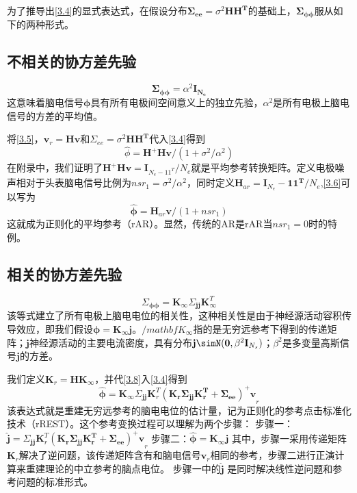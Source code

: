 为了推导出\eqref{3.4}的显式表达式，在假设分布$\mathbf{\Sigma_{ee}}=\sigma^{2}\mathbf{HH^T}$的基础上，$\mathbf{\Sigma_{\phi\phi}}$服从如下的两种形式。
\subsection{不相关的协方差先验}
\begin{equation}\label{3.5}
\mathbf{\Sigma_{\phi\phi}}=\alpha^{2}\mathbf{I_{N_{e}}}
\end{equation}
这意味着脑电信号$\mathbf{\phi}$具有所有电极间空间意义上的独立先验，$\alpha^{2}$是所有电极上脑电信号的方差的平均值。

将\eqref{3.5}，$\mathbf{v}_{r}=\mathbf{Hv}$和$\Sigma_{ee}=\sigma^{2}\mathbf{HH^{T}}$代入\eqref{3.4}得到
\begin{equation}\label{3.6}
\hat{\phi}=\mathbf{H^{+}Hv}/(1+\sigma^{2}/{\alpha^{2}})
\end{equation}
在附录中，我们证明了$\mathbf{H^{+}Hv}=\mathbf{I}_{N_{e}-11^{T}}/{N_{e}}$就是平均参考转换矩阵。定义电极噪声相对于头表脑电信号比例为$nsr_{1}=\sigma^{2}/\alpha^{2}$，同时定义$\mathbf{H}_{ar}=\mathbf{I}_{N_{e}}-\mathbf{11^T}/{N_{e}}$,\eqref{3.6}可以写为
\begin{equation}
\hat{\mathbf{\phi}}=\mathbf{H}_{ar}\mathbf{v}/(1+nsr_{1})
\end{equation}
这就成为正则化的平均参考（rAR）。显然，传统的AR是rAR当$nsr_{1}=0$时的特例。
\subsection{相关的协方差先验}
\begin{equation}\label{3.8}
\Sigma_{\mathbf{\phi\phi}}=\mathbf{K}_{\infty}\Sigma_{\mathbf{jj}}\mathbf{K}_{\infty}^T
\end{equation}
该等式建立了所有电极上脑电电位的相关性，这种相关性是由于神经源活动容积传导效应，即我们假设$\mathbf{\phi}=\mathbf{K}_{\infty}\mathbf{j}$。$/mathbf{K}_{\infty}$指的是无穷远参考下得到的传递矩阵；$\mathbf{j}$神经源活动的主要电流密度，具有分布$\mathbf{j}\simN(\mathbf{0},\beta^{2}\mathbf{I}_{N_{s}})$；$\beta^{2}$是多变量高斯信号$\mathbf{j}$的方差。

我们定义$\mathbf{K}_{r}=\mathbf{HK}_{\infty}$，并代\eqref{3.8}入\eqref{3.4}得到
\begin{equation}\label{3.9}
\hat{\mathbf{\phi}}=\mathbf{K}_{\infty}\Sigma_{\mathbf{jj}}\mathbf{K}_{r}^{T}\mathbf{(\mathbf{K}_{r}\Sigma_{\mathbf{jj}}\mathbf{K}_{r}^{T}+\Sigma_{ee})^{+}v}_{r}
\end{equation}
该表达式就是重建无穷远参考的脑电电位的估计量，记为正则化的参考点击标准化技术（rREST）。这个参考变换过程可以理解为两个步骤：
步骤一：$\hat{\mathbf{j}}=\Sigma_{\mathbf{jj}}\mathbf{K}_{r}^{T}\mathbf{(\mathbf{K}_{r}\Sigma_{\mathbf{jj}}\mathbf{K}_{r}^{T}+\Sigma_{ee})^{+}v}_{r}$
步骤二：$\hat{\mathbf{\phi}}=\mathbf{K}_{\infty}\mathbf{j}$
其中，步骤一采用传递矩阵$\mathbf{K}_{r}$解决了逆问题，该传递矩阵含有和脑电信号$\mathbf{v}_{r}$相同的参考，步骤二进行正演计算来重建理论的中立参考的脑点电位。 步骤一中的$\hat{\mathbf{j}}$ 是同时解决线性逆问题和参考问题的标准形式。

